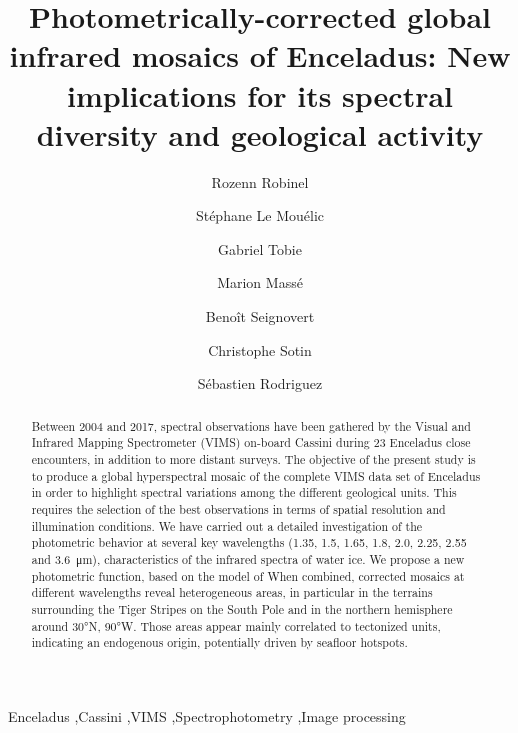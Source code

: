 \documentclass{arxiv-icarus}
\begin{document}
\begin{frontmatter}
\title{Photometrically-corrected global infrared mosaics of Enceladus: New implications for its spectral diversity and geological activity}

\author[LPG]{Rozenn Robinel}
\author[LPG]{St\'{e}phane Le Mou\'{e}lic}
\author[LPG]{Gabriel Tobie}
\author[LPG]{Marion Mass\'{e}}
\author[JPL]{Beno\^{i}t Seignovert}
\author[JPL]{Christophe Sotin}
\author[IPG]{S\'{e}bastien Rodriguez}

\address[LPG]{Laboratoire de Plan\'{e}tologie et G\'{e}odynamique, UMR 6112, CNRS, Universit\'{e} de Nantes, 2 chemin de la Houssini\`{e}re, 44300 Nantes, Franc}
\address[JPL]{Jet Propulsion Laboratory, California Institute of Technology, Pasadena, CA 91109, USA}
\address[IPG]{Universit\'{w} de Paris, Institut de Physique du Globe de Paris, CNRS, Paris, France}

\begin{abstract}
Between 2004 and 2017, spectral observations have been gathered by the Visual and Infrared Mapping Spectrometer (VIMS) on-board Cassini \citep{Brown2004} during 23 Enceladus close encounters, in addition to more distant surveys. The objective of the present study is to produce a global hyperspectral mosaic of the complete VIMS data set of Enceladus in order to highlight spectral variations among the different geological units. This requires the selection of the best observations in terms of spatial resolution and illumination conditions. We have carried out a detailed investigation of the photometric behavior at several key wavelengths (\num{1.35}, \num{1.5}, \num{1.65}, \num{1.8}, \num{2.0}, \num{2.25}, \num{2.55} and \SI{3.6}{\um}), characteristics of the infrared spectra of water ice. We propose a new photometric function, based on the model of \cite{Shkuratov2011} When combined, corrected mosaics at different wavelengths reveal heterogeneous areas, in particular in the terrains surrounding the Tiger Stripes on the South Pole and in the northern hemisphere around \ang{30}N, \ang{90}W. Those areas appear mainly correlated to tectonized units, indicating an endogenous origin, potentially driven by seafloor hotspots.
\end{abstract}

\begin{keyword}
Enceladus \sep Cassini \sep VIMS \sep Spectrophotometry \sep Image processing
\end{keyword}

\end{frontmatter}
\end{document}
